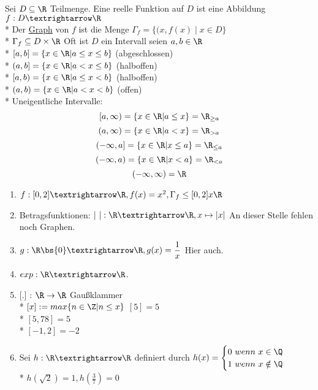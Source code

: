 Sei $D\subseteq\R$ Teilmenge. Eine reelle Funktion auf $D$ ist eine Abbildung $f:D→\R$\\*
%
Der \ul{Graph} von $f$ ist die Menge $\Gamma_f = \{(x, f(x)\mid x \in D \}$\\*
$ \Gamma_f \subseteq D \times \R$ 
%
\bem Oft ist $D$ ein Intervall
%
seien $a, b \in \R$ \\*
$[a, b] = \{x \in \R| a \leq x \leq b\}$ (abgeschlossen)\\*
$(a, b] = \{x \in \R| a < x \leq b\}$ (halboffen)\\*
$[a, b) = \{x \in \R| a \leq x < b\}$ (halboffen)\\* %
$(a, b) = \{x \in \R| a < x < b\}$ (offen)\\*
%
Uneigentliche Intervalle:
$$[a, \infty) = \{x \in \R | a \leq x\} = \R_{\geq a}$$
$$(a, \infty) = \{x \in \R | a < x\} = \R_{> a}$$
$$(- \infty, a] = \{x \in \R | x \leq a\} = \R_{\leq a}$$
$$(- \infty, a) = \{x \in \R | x < a\} = \R_{< a}$$
$$(- \infty, \infty) = \R$$
%
\begin{enumerate}
\item{$f:[0,2]→\R, f(x)=x^2, \Gamma_f \leq [0,2] x\R$}
\item{Betragsfunktionen: $|\ |: \R→\R, x\mapsto|x|$
}
An dieser Stelle fehlen noch Graphen.
\item{$g:\R\bs\{0\}→\R, g(x)=\dfrac{1}{x}$
Hier auch.
}
\item{$exp:\R→\R$.}
\item{[.] : $\R \to \R$ Gaußklammer\\*
$[x] := max\{n \in \Z | n \leq x \}$
\bsp
$[5] = 5$\\*
$[5,78] = 5$\\*
$[-1,2] = -2$}
\item{Sei $h:\R→\R$ definiert durch $h(x)=\begin{cases}0\ wenn\ x\in\Q\\* 1\ wenn\ x\notin\Q\end{cases}$\\*
$h(\sqrt{2}) = 1, h (\frac{3}{7}) = 0$}
\end{enumerate}

